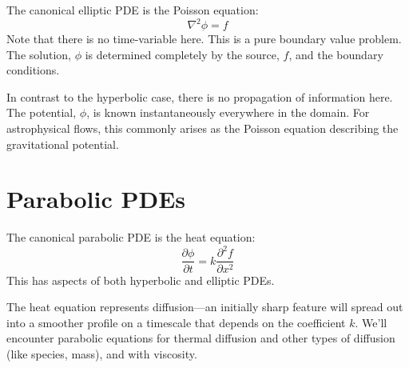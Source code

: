 The canonical elliptic PDE is the Poisson equation:
\begin{equation}
  \nabla^2 \phi = f
\end{equation}
Note that there is no time-variable here.  This is a pure boundary
value problem.  The solution, $\phi$ is determined completely by the
source, $f$, and the boundary conditions.

In contrast to the hyperbolic case, there is no propagation of
information here.  The potential, $\phi$, is known instantaneously
everywhere in the domain.  For astrophysical flows, this commonly
arises as the Poisson equation describing the gravitational potential.



\section{Parabolic PDEs}

The canonical parabolic PDE is the heat equation:
\begin{equation}
  \frac{\partial \phi}{\partial t} = k \frac{\partial^2 f}{\partial x^2}
\end{equation}
This has aspects of both hyperbolic and elliptic PDEs.

The heat equation represents diffusion---an initially sharp feature
will spread out into a smoother profile on a timescale that depends on
the coefficient $k$.  We'll encounter parabolic equations for thermal
diffusion and other types of diffusion (like species, mass), and with
viscosity.


